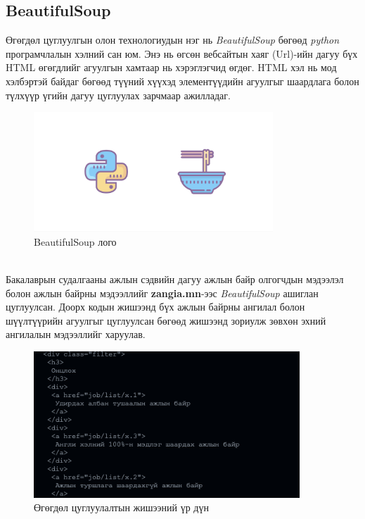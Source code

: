 \subsection{BeautifulSoup}
Өгөгдөл цуглуулгын олон технологиудын нэг нь \textit{BeautifulSoup} бөгөөд \textit{python} програмчлалын хэлний сан юм. Энэ нь өгсөн вебсайтын хаяг (Url)-ийн дагуу бүх HTML өгөгдлийг агуулгын хамтаар нь хэрэглэгчид өгдөг. HTML хэл нь мод хэлбэртэй байдаг бөгөөд түүний хүүхэд элементүүдийн агуулгыг шаардлага болон түлхүүр үгийн дагуу цуглуулах зарчмаар ажилладаг. 
\begin{figure}[h]
	\centering
  \includegraphics*[height=4.5cm]{images/bs4.png}
	\caption{BeautifulSoup лого}
  \label{fig:bsLogo}
\end{figure}
\\Бакалаврын судалгааны ажлын сэдвийн дагуу ажлын байр олгогчдын мэдээлэл болон ажлын байрны мэдээллийг \textbf{zangia.mn}-ээс \textit{BeautifulSoup} ашиглан цуглуулсан. Доорх кодын жишээнд бүх ажлын байрны ангилал болон шүүлтүүрийн агуулгыг цуглуулсан бөгөөд жишээнд зориулж зөвхөн эхний ангилалын мэдээллийг харуулав.

\begin{figure}[h]
  \centering
  \includegraphics*[height=5.5cm]{images/bsExample.png}
	\caption{Өгөгдөл цуглуулалтын жишээний үр дүн}
  \label{fig:resultBS}
\end{figure}
